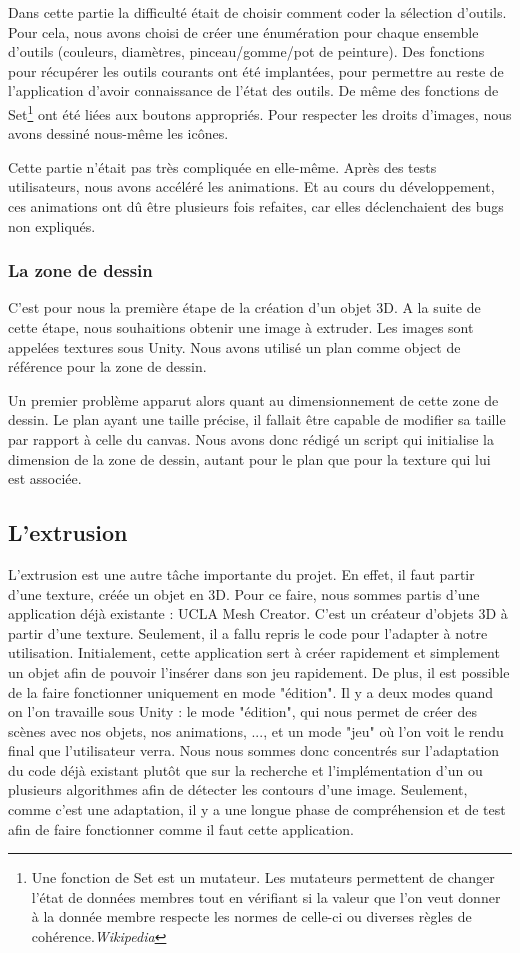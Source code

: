 \documentclass[a4paper,11pt]{article}
\begin{document}
				Dans cette partie la difficulté était de choisir comment coder la sélection d'outils. Pour cela, nous avons choisi de créer une énumération pour chaque ensemble d'outils (couleurs, diamètres, pinceau/gomme/pot de peinture). Des fonctions pour récupérer les outils courants ont été implantées, pour permettre au reste de l'application d'avoir connaissance de l'état des outils. De même des fonctions de Set\footnote{Une fonction de Set est un mutateur. Les mutateurs permettent de changer l'état de données membres tout en vérifiant si la valeur que l'on veut donner à la donnée membre respecte les normes de celle-ci ou diverses règles de cohérence.\emph{Wikipedia}} ont été liées aux boutons appropriés. Pour respecter les droits d'images, nous avons dessiné nous-même les icônes.
				
				Cette partie n'était pas très compliquée en elle-même. Après des tests utilisateurs, nous avons accéléré les animations. Et au cours du développement, ces animations ont dû être plusieurs fois refaites, car elles déclenchaient des bugs non expliqués.
			\subsubsection{La zone de dessin}
			
			C'est pour nous la première étape de la création d'un objet 3D. A la suite de cette étape, nous souhaitions obtenir une image à extruder. Les images sont appelées textures sous Unity. Nous avons utilisé un plan comme object de référence pour la zone de dessin.
			
			Un premier problème apparut alors quant au dimensionnement de cette zone de dessin. Le plan ayant une taille précise, il fallait être capable de modifier sa taille par rapport à celle du canvas. Nous avons donc rédigé un script qui initialise la dimension de la zone de dessin, autant pour le plan que pour la texture qui lui est associée.
		\subsection{L'extrusion}
		
		L'extrusion est une autre tâche importante du projet. En effet, il faut partir d'une texture, créée un objet en 3D. Pour ce faire, nous sommes partis d'une application déjà existante : UCLA Mesh Creator. C'est un créateur d'objets 3D à partir d'une texture. Seulement, il a fallu repris le code pour l'adapter à notre utilisation. Initialement, cette application sert à créer rapidement et simplement un objet afin de pouvoir l'insérer dans son jeu rapidement. De plus, il est possible de la faire fonctionner uniquement en mode "édition". Il y a deux modes quand on l'on travaille sous Unity : le mode "édition", qui nous permet de créer des scènes avec nos objets, nos animations, ..., et un mode "jeu" où l'on voit le rendu final que l'utilisateur verra. Nous nous sommes donc concentrés sur l'adaptation du code déjà existant plutôt que sur la recherche et l'implémentation d'un ou plusieurs algorithmes afin de détecter les contours d'une image. Seulement, comme c'est une adaptation, il y a une longue phase de compréhension et de test afin de faire fonctionner comme il faut cette application. 
\end{document}
